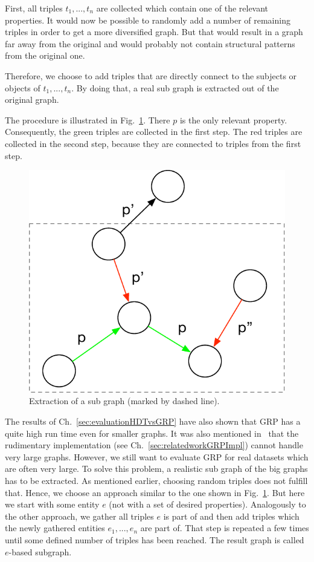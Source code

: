 First, all triples $t_1,...,t_n$ are collected which contain one of the relevant properties. It would now be possible to randomly add a number of remaining triples in order to get a more diversified graph. But that would result in a graph far away from the original and would probably not contain structural patterns from the original one.

Therefore, we choose to add triples that are directly connect to the subjects or objects of $t_1,...,t_n$. By doing that, a real sub graph is extracted out of the original graph.

The procedure is illustrated in Fig.~\ref{fig:subgraph}. There $p$ is the only relevant property. Consequently, the green triples are collected in the first step. The red triples are collected in the second step, because they are connected to triples from the first step.

\begin{figure}
	\centering
	\includegraphics[width=0.4\linewidth]{figures/4_implementation/subgraph}
	\caption{Extraction of a sub graph (marked by dashed line).}
	\label{fig:subgraph}
\end{figure}

The results of Ch.~\ref{sec:evaluationHDTvsGRP} have also shown that GRP has a quite high run time even for smaller graphs. It was also mentioned in~\cite{maneth} that the rudimentary implementation (see Ch.~\ref{sec:relatedworkGRPImpl}) cannot handle very large graphs. However, we still want to evaluate GRP for real datasets which are often very large. To solve this problem, a realistic sub graph of the big graphs has to be extracted. As mentioned earlier, choosing random triples does not fulfill that. Hence, we choose an approach similar to the one shown in Fig.~\ref{fig:subgraph}. But here we start with some entity $e$ (not with a set of desired properties). Analogously to the other approach, we gather all triples $e$ is part of and then add triples which the newly gathered entities $e_1,...,e_n$ are part of. That step is repeated a few times until some defined number of triples has been reached. The result graph is called $e$-based subgraph.



